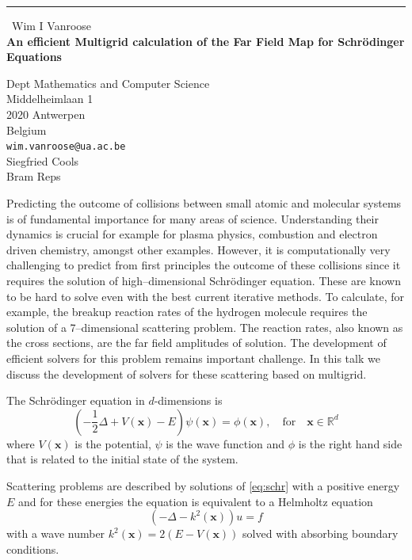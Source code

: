 \documentclass{report}
\begin{document}
\begin{center}
\rule{6in}{1pt} \
{\large Wim I Vanroose \\
{\bf An efficient Multigrid calculation of the Far Field Map for Schr\"odinger Equations}}

Dept Mathematics and Computer Science \\ Middelheimlaan 1 \\ 2020 Antwerpen \\ Belgium
\\
{\tt wim.vanroose@ua.ac.be}\\
Siegfried Cools\\
Bram Reps\end{center}


Predicting the outcome of collisions between small atomic and
molecular systems is of fundamental importance for many areas of
science. Understanding their dynamics is crucial for example for
plasma physics, combustion and electron driven chemistry, amongst
other examples. However, it is computationally very challenging to
predict from first principles the outcome of these collisions since it
requires the solution of high--dimensional Schr\"odinger
equation. These are known to be hard to solve even with the best
current iterative methods. To calculate, for example, the breakup
reaction rates of the hydrogen molecule requires the solution of a
7--dimensional scattering problem. The reaction rates, also known as
the cross sections, are the far field amplitudes of solution. The
development of efficient solvers for this problem remains important
challenge. In this talk we discuss the development of solvers for
these scattering based on multigrid.


The Schr\"odinger equation in $d$-dimensions is
\begin{equation} \label{eq:schr}
(-\frac{1}{2}\Delta + V(\mathbf{x}) - E)\psi(\mathbf{x}) =
\phi(\mathbf{x}), \quad \text{for} \quad \mathbf{x} \in \mathbb{R}^d
\end{equation}
where $V(\mathbf{x})$ is the potential, $\psi$ is the wave function
and $\phi$ is the right hand side that is related to the initial state
of the system.

Scattering problems are described by solutions of \eqref{eq:schr} with
a positive energy $E$ and for these energies the equation is
equivalent to a Helmholtz equation
\begin{equation}
(-\Delta -k^2(\mathbf{x}))u = f
\end{equation}
with a wave number $k^2(\mathbf{x}) = 2\left(E-V(\mathbf{x})\right)$
solved with absorbing boundary conditions.
\end{document}
